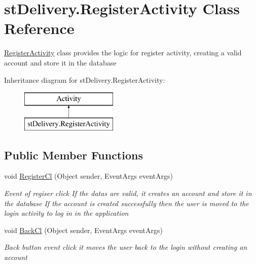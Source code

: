 \hypertarget{classst_delivery_1_1_register_activity}{}\section{st\+Delivery.\+Register\+Activity Class Reference}
\label{classst_delivery_1_1_register_activity}


\hyperlink{classst_delivery_1_1_register_activity}{Register\+Activity} class provides the logic for register activity, creating a valid account and store it in the database  


Inheritance diagram for st\+Delivery.\+Register\+Activity\+:\begin{figure}[H]
\begin{center}
\leavevmode
\includegraphics[height=2.000000cm]{classst_delivery_1_1_register_activity}
\end{center}
\end{figure}
\subsection*{Public Member Functions}
\begin{DoxyCompactItemize}
\item 
void \hyperlink{classst_delivery_1_1_register_activity_a20eec67670bd72a456f0323ffb4b5b1c}{Register\+Cl} (Object sender, Event\+Args event\+Args)
\begin{DoxyCompactList}\small\item\em Event of regiser click If the datas are valid, it creates an account and store it in the database If the account is created successfully then the user is moved to the login activity to log in in the application \end{DoxyCompactList}\item 
void \hyperlink{classst_delivery_1_1_register_activity_a49212d8b21bf5b929d4c1da4b8a86e6c}{Back\+Cl} (Object sender, Event\+Args event\+Args)
\begin{DoxyCompactList}\small\item\em Back button event click it moves the user back to the login without creating an account \end{DoxyCompactList}\end{DoxyCompactItemize}
